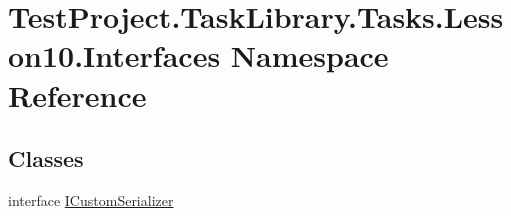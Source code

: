 \hypertarget{namespace_test_project_1_1_task_library_1_1_tasks_1_1_lesson10_1_1_interfaces}{}\section{Test\+Project.\+Task\+Library.\+Tasks.\+Lesson10.\+Interfaces Namespace Reference}
\label{namespace_test_project_1_1_task_library_1_1_tasks_1_1_lesson10_1_1_interfaces}
\subsection*{Classes}
\begin{DoxyCompactItemize}
\item 
interface \mbox{\hyperlink{interface_test_project_1_1_task_library_1_1_tasks_1_1_lesson10_1_1_interfaces_1_1_i_custom_serializer}{I\+Custom\+Serializer}}
\end{DoxyCompactItemize}
